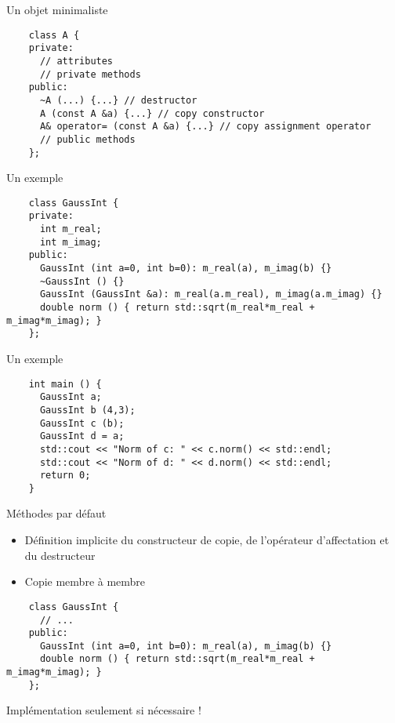 \begin{frame}[fragile]{Un objet minimaliste}
  \begin{lstlisting}
    class A {
    private:
      // attributes
      // private methods
    public:
      ~A (...) {...} // destructor
      A (const A &a) {...} // copy constructor
      A& operator= (const A &a) {...} // copy assignment operator
      // public methods
    };
  \end{lstlisting}
\end{frame}

\begin{frame}[fragile]{Un exemple}
  \begin{lstlisting}
    class GaussInt {
    private:
      int m_real;
      int m_imag;
    public:
      GaussInt (int a=0, int b=0): m_real(a), m_imag(b) {}
      ~GaussInt () {}
      GaussInt (GaussInt &a): m_real(a.m_real), m_imag(a.m_imag) {}
      double norm () { return std::sqrt(m_real*m_real + m_imag*m_imag); }
    };
  \end{lstlisting}
\end{frame}

\begin{frame}[fragile]{Un exemple}
  \begin{lstlisting}
    int main () {
      GaussInt a;
      GaussInt b (4,3);
      GaussInt c (b);
      GaussInt d = a;
      std::cout << "Norm of c: " << c.norm() << std::endl;
      std::cout << "Norm of d: " << d.norm() << std::endl;
      return 0;
    }
  \end{lstlisting}
\end{frame}

\begin{frame}[fragile]{Méthodes par défaut}
  \begin{itemize}
  \item Définition implicite du constructeur de copie, de l'opérateur d'affectation et du destructeur
  \item Copie membre à membre
  \end{itemize}

  \begin{lstlisting}
    class GaussInt {
      // ...
    public:
      GaussInt (int a=0, int b=0): m_real(a), m_imag(b) {}
      double norm () { return std::sqrt(m_real*m_real + m_imag*m_imag); }
    };
  \end{lstlisting}
  
  Implémentation seulement si nécessaire !
\end{frame}

